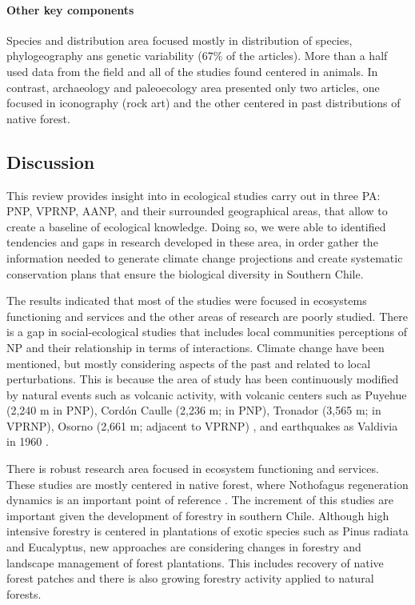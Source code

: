 \documentclass[]{article}
\let\oldparagraph\paragraph
\renewcommand{\paragraph}[1]{\oldparagraph{#1}\mbox{}}
\begin{document}
\hypertarget{other-key-components}{%
\paragraph{Other key components}\label{other-key-components}}

Species and distribution area focused mostly in distribution of species, phylogeography ans genetic variability (67\% of the articles). More than a half used data from the field and all of the studies found centered in animals. In contrast, archaeology and paleoecology area presented only two articles, one focused in iconography (rock art) and the other centered in past distributions of native forest.

\hypertarget{discussion}{%
\subsection{Discussion}\label{discussion}}

This review provides insight into in ecological studies carry out in three PA: PNP, VPRNP, AANP, and their surrounded geographical areas, that allow to create a baseline of ecological knowledge. Doing so, we were able to identified tendencies and gaps in research developed in these area, in order gather the information needed to generate climate change projections and create systematic conservation plans that ensure the biological diversity in Southern Chile.

The results indicated that most of the studies were focused in ecosystems functioning and services and the other areas of research are poorly studied. There is a gap in social-ecological studies that includes local communities perceptions of NP and their relationship in terms of interactions.
Climate change have been mentioned, but mostly considering aspects of the past and related to local perturbations. This is because the area of study has been continuously modified by natural events such as volcanic activity, with volcanic centers such as Puyehue (2,240 m in PNP), Cordón Caulle (2,236 m; in PNP), Tronador (3,565 m; in VPRNP), Osorno (2,661 m; adjacent to VPRNP) \citep{petit1999cronologia, SternVolcanism}, and earthquakes as Valdivia in 1960 \citep{melnick2018back}.

There is robust research area focused in ecosystem functioning and services. These studies are mostly centered in native forest, where Nothofagus regeneration dynamics is an important point of reference \citep{VEBLEN1979nothofagus, Pollmann2004Nothofagus, Soto2017nothofagus}.
The increment of this studies are important given the development of forestry in southern Chile.
Although high intensive forestry is centered in plantations of exotic species such as Pinus radiata and Eucalyptus, new approaches are considering changes in forestry and landscape management of forest plantations. This includes recovery of native forest patches \citep{salas2016forest} and there is also growing forestry activity applied to natural forests.
\end{document}
